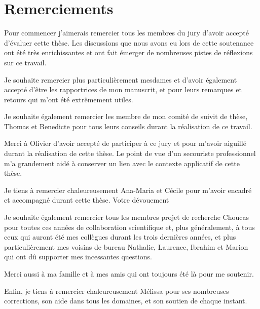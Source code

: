 \section*{Remerciements}

Pour commencer j'aimerais remercier tous les membres du jury d'avoir
accepté d'évaluer cette thèse. Les discussions que nous avons eu lors
de cette soutenance ont été très enrichissantes et ont fait émerger de
nombreuses pistes de réflexions sur ce travail.

Je souhaite remercier plus particulièrement mesdames
 et  d'avoir également accepté
d'être les rapportrices de mon manuscrit, et pour leurs remarques et
retours qui m'ont été extrêmement utiles.

Je souhaite également remercier les membre de mon comité de suivit de
thèse, Thomas  et Benedicte  pour tous
leurs conseils durant la réalisation de ce travail.

Merci à Olivier  d'avoir accepté de participer à ce jury et
pour m'avoir aiguillé durant la réalisation de cette thèse. Le point
de vue d'un secouriste professionnel m'a grandement aidé à conserver
un lien avec le contexte applicatif de cette thèse.

Je tiens à remercier chaleureusement Ana-Maria 
et Cécile  pour m'avoir encadré et accompagné durant
cette thèse. Votre dévouement 

Je souhaite également remercier tous les membres projet de recherche
Choucas pour toutes ces années de collaboration scientifique et, plus
généralement, à tous ceux qui auront été mes collègues durant les
trois dernières années, et plus particulièrement mes voisins de bureau
Nathalie, Laurence, Ibrahim et Marion qui ont dû supporter mes
incessantes questions.

Merci aussi à ma famille et à mes amis qui ont toujours été là pour me
soutenir.

Enfin, je tiens à remercier chaleureusement Mélissa pour ses
nombreuses corrections, son aide dans tous les domaines, et son
soutien de chaque instant.


